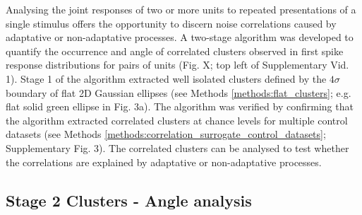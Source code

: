 \documentclass{article}
\begin{document}
Analysing the joint responses of two or more units to repeated presentations of a single stimulus offers the opportunity to discern noise correlations caused by adaptative or non-adaptative processes.
A two-stage algorithm was developed to quantify the occurrence and angle of correlated clusters observed in first spike response distributions for pairs of units (Fig. X; top left of Supplementary Vid. 1). Stage 1 of the algorithm extracted well isolated clusters defined by the $4\sigma$ boundary of flat 2D Gaussian ellipses (see Methods \ref{methods:flat_clusters}; e.g. flat solid green ellipse in Fig. 3a).
The algorithm was verified by confirming that the algorithm extracted correlated clusters at chance levels for multiple control datasets (see Methods \ref{methods:correlation_surrogate_control_datasets}; Supplementary Fig. 3). The correlated clusters can be analysed to test whether the correlations are explained by adaptative or non-adaptative processes.








\subsection*{Stage 2 Clusters - Angle analysis}
\label{results:cluster_angle}
\end{document}
